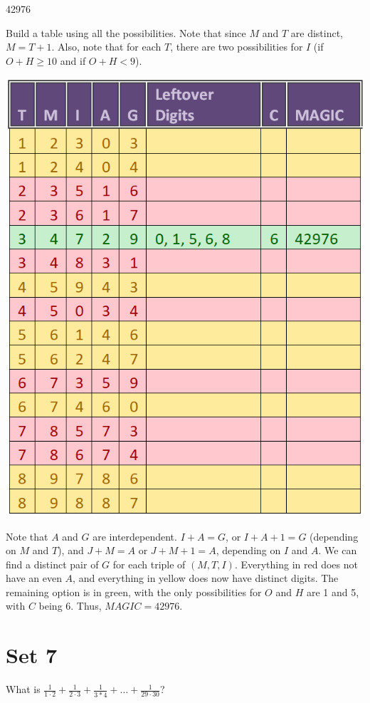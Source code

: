\documentclass[11pt]{article}
\begin{document}
\begin{answer}
42976
\end{answer}

\begin{solution}
Build a table using all the possibilities. Note that since $M$ and $T$ are distinct, $M=T+1$. Also, note that for each $T$, there are two possibilities for $I$ (if $O+H \geq 10$ and if $O+H < 9$).
\begin{center}
    \includegraphics[scale=0.5]{guts_table}
\end{center}
Note that $A$ and $G$ are interdependent. $I+A=G$, or $I+A+1=G$ (depending on $M$ and $T$), and $J+M=A$ or $J+M+1=A$, depending on $I$ and $A$. We can find a distinct pair of $G$ for each triple of $(M, T, I)$. Everything in red does not have an even $A$, and everything in yellow does now have distinct digits. The remaining option is in green, with the only possibilities for $O$ and $H$ are 1 and 5, with $C$ being 6. Thus,  $MAGIC=\boxed{42976}$.
\end{solution}

\newpage
\section*{Set 7}
\begin{problem}
What is $\frac{1}{1\cdot2}+\frac{1}{2\cdot3} + \frac{1}{3*4} + \dots + \frac{1}{29\cdot30}$?
\end{problem}
\end{document}
